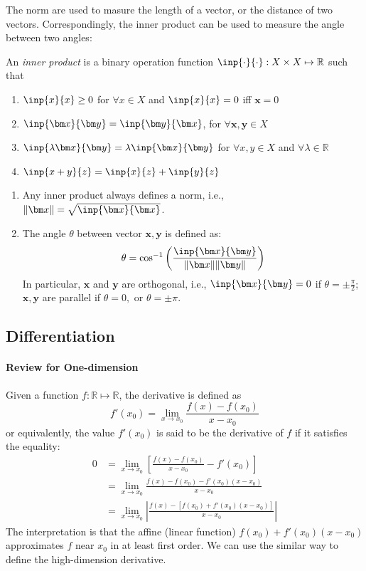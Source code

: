 The norm are used to masure the length of a vector, or the distance of two vectors. Correspondingly, the inner product can be used to measure the angle between two angles:
\begin{definition}
An \emph{inner product} is a binary operation function $\inp{\cdot}{\cdot}: X\times X\mapsto\mathbb{R}$ such that
\begin{enumerate}
\item
$\inp{x}{x}\ge0$ for $\forall x\in X$ and $\inp{x}{x}=0$ iff $\bm x=0$
\item
$\inp{\bm x}{\bm y}=\inp{\bm y}{\bm x}$, for $\forall \bm x,\bm y\in X$
\item
$\inp{\lambda\bm x}{\bm y}=\lambda\inp{\bm x}{\bm y}$ for $\forall x,y\in X$ and $\forall \lambda\in\mathbb{R}$
\item
$\inp{x+y}{z}=\inp{x}{z}+\inp{y}{z}$
\end{enumerate}
\end{definition}
 \begin{remark}
 \begin{enumerate}
\item
 Any inner product always defines a norm, i.e., $\|\bm x\|=\sqrt{\inp{\bm x}{\bm x}}$.
 \item
The angle $\theta$ between vector $\bm x,\bm y$ is defined as:
\[
\theta = \cos^{-1}\left(\frac{\inp{\bm x}{\bm y}}{\|\bm x\|\|\bm y\|}\right)
\]
In particular, $\bm x$ and $\bm y$ are orthogonal, i.e., $\inp{\bm x}{\bm y}=0$ if $\theta=\pm\frac{\pi}{2}$; $\bm x,\bm y$ are parallel if $\theta=0,$ or $\theta=\pm\pi$.
\end{enumerate}
 \end{remark}
\subsection{Differentiation}
\paragraph{Review for One-dimension}
Given a function $f:\mathbb{R}\mapsto\mathbb{R}$, the derivative is defined as
\[
f'(x_0)=\lim_{x\to x_0}\frac{f(x) - f(x_0)}{x-x_0}
\]
or equivalently, the value $f'(x_0)$ is said to be the derivative of $f$ if it satisfies the equality:
\begin{align*}
0&=
\lim_{x\to x_0}\left[\frac{f(x) - f(x_0)}{x-x_0} - f'(x_0)\right]\\
&=
\lim_{x\to x_0}\frac{f(x) - f(x_0) - f'(x_0)(x-x_0)}{x-x_0}\\
&=
\lim_{x\to x_0}
\left|
\frac{
f(x) - [f(x_0) + f'(x_0)(x-x_0)]
}{x-x_0}
\right|
\end{align*}
The interpretation is that the affine (linear function) $f(x_0)+f'(x_0)(x-x_0)$ approximates $f$ near $x_0$ in at least first order. We can use the similar way to define the high-dimension derivative.
